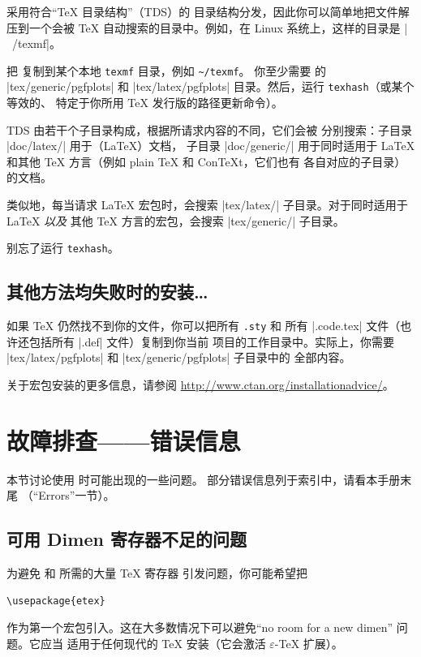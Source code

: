 \PGFPlots{} 采用符合“\TeX{} 目录结构”（TDS）的
目录结构分发，因此你可以简单地把文件解压到一个会被
\TeX{} 自动搜索的目录中。例如，在 Linux 系统上，这样的目录是
|~/texmf|。

把 \PGFPlots{} 复制到某个本地 \texttt{texmf} 目录，例如 \lstinline!~/texmf!。
你至少需要 \PGFPlots{} 的 |tex/generic/pgfplots| 和
|tex/latex/pgfplots| 目录。然后，运行 \lstinline!texhash!（或某个等效的、
特定于你所用 \TeX{} 发行版的路径更新命令）。

TDS 由若干个子目录构成，根据所请求内容的不同，它们会被
分别搜索：子目录
|doc/latex/| 用于（\LaTeX{}）文档，
子目录 |doc/generic/| 用于同时适用于
\LaTeX{} 和其他 \TeX{} 方言（例如 plain \TeX{} 和 Con\TeX{}t，它们也有
各自对应的子目录）的文档。

类似地，每当请求 \LaTeX{} 宏包时，会搜索
|tex/latex/| 子目录。对于同时适用于 \LaTeX{} \emph{以及}
其他 \TeX{} 方言的宏包，会搜索 |tex/generic/|
子目录。

别忘了运行 \lstinline!texhash!。

\subsection{其他方法均失败时的安装\ldots}

如果 \TeX{} 仍然找不到你的文件，你可以把所有 \lstinline!.sty! 和
所有 |.code.tex| 文件（也许还包括所有 |.def| 文件）复制到你当前
项目的工作目录中。实际上，你需要
|tex/latex/pgfplots| 和 |tex/generic/pgfplots| 子目录中的
全部内容。

关于宏包安装的更多信息，请参阅 \url{http://www.ctan.org/installationadvice/}。


\section{故障排查——错误信息}

本节讨论使用 \PGFPlots{} 时可能出现的一些问题。
部分错误信息列于索引中，请看本手册末尾
（“Errors”一节）。


\subsection{可用 Dimen 寄存器不足的问题}

为避免 \PGF{} 和 \PGFPlots{} 所需的大量 \TeX{} 寄存器
引发问题，你可能希望把
%
\begin{verbatim}
\usepackage{etex}
\end{verbatim}
%
作为第一个宏包引入。这在大多数情况下可以避免“no room for a new
dimen” 问题。它应当
适用于任何现代的 \TeX{} 安装（它会激活
$\varepsilon$-\TeX{} 扩展）。


